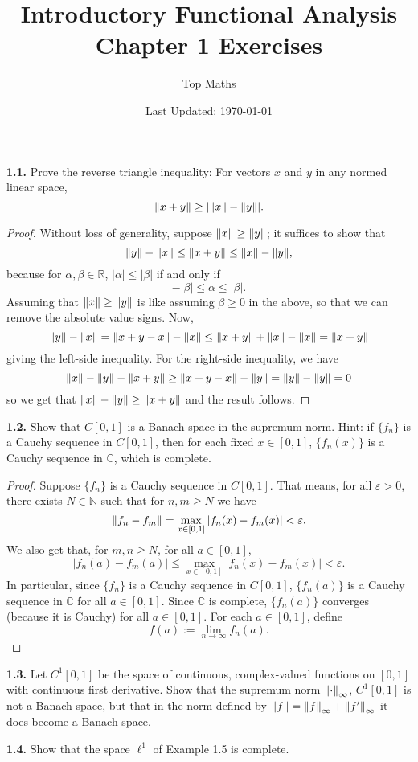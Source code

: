 \documentclass[12pt]{article}
\title{Introductory Functional Analysis \\ Chapter 1 Exercises}
\date{Last Updated: \today}
\author{Top Maths}
\theoremstyle{definition}
\begin{document}
	\maketitle 
	
	\noindent \textbf{1.1.} Prove the reverse triangle inequality: For vectors $x$ and $y$ in any normed linear space, $$\norm{x + y} \geq \abs{\norm{x} - \norm{y}}.$$
		\begin{proof}
			Without loss of generality, suppose $\norm{x} \geq \norm{y}$; it suffices to show that $$\norm{y} - \norm{x} \leq \norm{x + y} \leq \norm{x} - \norm{y},$$ because for $\alpha, \beta \in \mathbb{R}$, $|\alpha| \leq |\beta|$ if and only if $$-|\beta| \leq \alpha \leq |\beta|.$$ Assuming that $\norm{x} \geq \norm{y}$ is like assuming $\beta \geq 0$ in the above, so that we can remove the absolute value signs. Now, $$\norm{y} - \norm{x} = \norm{x + y - x} - \norm{x} \leq \norm{x + y} + \norm{x} - \norm{x} = \norm{x + y}$$ giving the left-side inequality. For the right-side inequality, we have 
			$$\norm{x} - \norm{y} - \norm{x + y} \geq \norm{x + y - x} - \norm{y} = \norm{y} - \norm{y} = 0$$ so we get that $\norm{x} - \norm{y} \geq \norm{x + y}$ and the result follows. 
		\end{proof}
	
	\noindent \textbf{1.2.} Show that $C[0, 1]$ is a Banach space in the supremum norm. Hint: if $\{f_n\}$ is a Cauchy sequence in $C[0, 1]$, then for each fixed $x \in [0, 1]$, $\{f_n(x)\}$ is a Cauchy sequence in $\mathbb{C}$, which is complete.
		\begin{proof}
			Suppose $\{f_n\}$ is a Cauchy sequence in $C[0, 1]$. That means, for all $\varepsilon > 0$, there exists $N \in \mathbb{N}$ such that for $n, m \geq N$ we have $$\norm{f_n - f_m} = \max_{x \in [0, 1]}|f_n(x) - f_m(x)| < \varepsilon.$$ We also get that, for $m, n \geq N$, for all $a \in [0, 1]$,  $$|f_n(a) - f_m(a)| \leq \max_{x \in [0, 1]} |f_n(x) - f_m(x)| < \varepsilon.$$ In particular, since $\{f_n\}$ is a Cauchy sequence in $C[0, 1]$, $\{f_n(a)\}$ is a Cauchy sequence in $\mathbb{C}$ for all $a \in [0, 1]$. Since $\mathbb{C}$ is complete, $\{f_n(a)\}$ converges (because it is Cauchy) for all $a \in [0, 1]$. For each $a \in [0, 1]$, define $$f(a) := \lim_{n \to \infty} f_n(a).$$ 
		\end{proof} 
	
	\noindent \textbf{1.3.} Let $C^1[0, 1]$ be the space of continuous, complex-valued functions on $[0, 1]$ with continuous first derivative. Show that the supremum norm $\norm{\cdot}_\infty$, $C^1[0, 1]$ is not a Banach space, but that in the norm defined by $\norm{f} = \norm{f}_\infty + \norm{f'}_\infty$ it does become a Banach space. 
	
	\noindent \textbf{1.4.} Show that the space $\ell^1$ of Example 1.5 is complete. 
\end{document}
